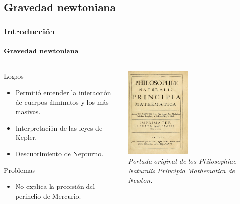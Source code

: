 \documentclass{beamer}
\begin{document}
\subsection{Gravedad newtoniana}
\begin{frame}
\frametitle{Introducción}
\framesubtitle{Gravedad newtoniana}
\begin{columns}[c]
  \begin{column}[c]{.5\textwidth}
  \begin{exampleblock}{Logros}
    \begin{itemize}
      \item Permitió entender la interacción de cuerpos diminutos y los más masivos.
      \item Interpretación de las leyes de Kepler.
      \item Descubrimiento de Nepturno.
    \end{itemize}
  \end{exampleblock}
  \begin{alertblock}{Problemas}
  \begin{itemize}
    \item No explica la precesión del perihelio de Mercurio.
  \end{itemize}
  \end{alertblock}
  \end{column}
  \begin{column}[c]{.5\textwidth}
    \centering
    \includegraphics[height=4.5cm]{newton} \\
    {\em\small Portada original de los Philosophiae Naturalis Principia Mathematica de Newton.}
  \end{column}
\end{columns}
\end{frame}
\end{document}
